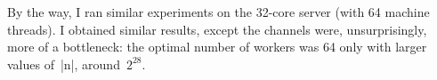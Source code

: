 By the way, I ran similar experiments on the 32-core server (with 64 machine
threads).  I obtained similar results, except the channels were,
unsurprisingly, more of a bottleneck: the optimal number of workers was 64
only with larger values of~|n|, around~$2^{28}$.





